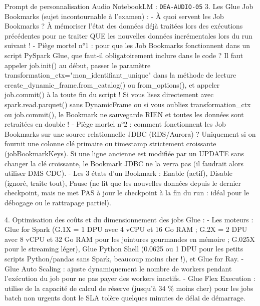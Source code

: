 \documentclass[11pt,a4paper]{article}
\begin{document}
\begin{promptbox}{Prompt de personnalisation Audio NotebookLM : \texttt{DEA-AUDIO-05}}
3. Les Glue Job Bookmarks (sujet incontournable à l'examen) :
- À quoi servent les Job Bookmarks ? À mémoriser l'état des données déjà traitées lors des exécutions précédentes pour ne traiter QUE les nouvelles données incrémentales lors du run suivant !
- Piège mortel n°1 : pour que les Job Bookmarks fonctionnent dans un script PySpark Glue, que faut-il obligatoirement inclure dans le code ? Il faut appeler job.init() au début, passer le paramètre transformation\_ctx="mon\_identifiant\_unique" dans la méthode de lecture create\_dynamic\_frame.from\_catalog() ou from\_options(), et appeler job.commit() à la toute fin du script ! Si vous lisez directement avec spark.read.parquet() sans DynamicFrame ou si vous oubliez transformation\_ctx ou job.commit(), le Bookmark ne sauvegarde RIEN et toutes les données sont retraitées en double !
- Piège mortel n°2 : comment fonctionnent les Job Bookmarks sur une source relationnelle JDBC (RDS/Aurora) ? Uniquement si on fournit une colonne clé primaire ou timestamp strictement croissante (jobBookmarkKeys). Si une ligne ancienne est modifiée par un UPDATE sans changer la clé croissante, le Bookmark JDBC ne la verra pas (il faudrait alors utiliser DMS CDC).
- Les 3 états d'un Bookmark : Enable (actif), Disable (ignoré, traite tout), Pause (ne lit que les nouvelles données depuis le dernier checkpoint, mais ne met PAS à jour le checkpoint à la fin du run : idéal pour le débogage ou le rattrapage partiel).

4. Optimisation des coûts et du dimensionnement des jobs Glue :
- Les moteurs : Glue for Spark (G.1X = 1 DPU avec 4 vCPU et 16 Go RAM ; G.2X = 2 DPU avec 8 vCPU et 32 Go RAM pour les jointures gourmandes en mémoire ; G.025X pour le streaming léger), Glue Python Shell (0.0625 ou 1 DPU pour les petits scripts Python/pandas sans Spark, beaucoup moins cher !), et Glue for Ray.
- Glue Auto Scaling : ajuste dynamiquement le nombre de workers pendant l'exécution du job pour ne pas payer des workers inactifs.
- Glue Flex Execution : utilise de la capacité de calcul de réserve (jusqu'à 34 \% moins cher) pour les jobs batch non urgents dont le SLA tolère quelques minutes de délai de démarrage.
\end{promptbox}
\end{document}
